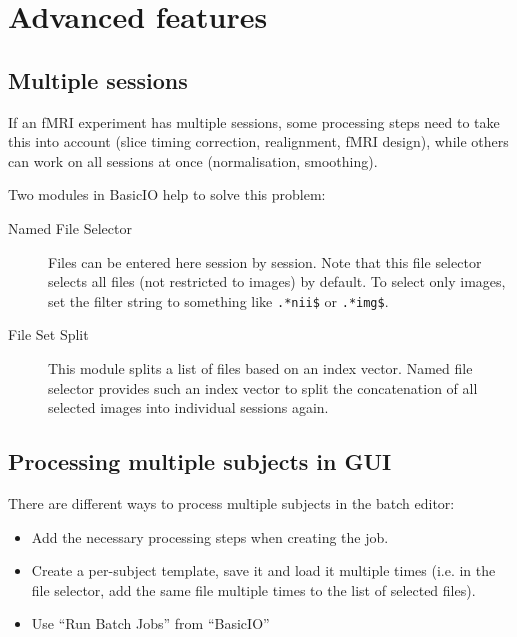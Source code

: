 \section{Advanced features}
\label{sec:batch_interface_advanced}

\subsection{Multiple sessions}

If an fMRI experiment has multiple sessions, some processing steps need to
take this into account (slice timing correction, realignment, fMRI design),
while others can work on all sessions at once (normalisation, smoothing). 

Two modules in BasicIO help to solve this problem:
\begin{description}
\item[Named File Selector] Files can be entered here session by session. Note
  that this file selector selects all files (not restricted to images) by
  default. To select only images, set the filter string to something like
  \verb|.*nii$| or \verb|.*img$|.
\item[File Set Split] This module splits a list of files based on an index
  vector. Named file selector provides such an index vector to split the
  concatenation of all selected images into individual sessions again.
\end{description}

\subsection{Processing multiple subjects in GUI}

There are different ways to process multiple subjects in the batch
editor:
\begin{itemize}
\item Add the necessary processing steps when creating the job.
\item Create a per-subject template, save it and load it multiple
  times (i.e. in the file selector, add the same file multiple times
  to the list of selected files).
\item Use ``Run Batch Jobs'' from ``BasicIO''
\end{itemize}

